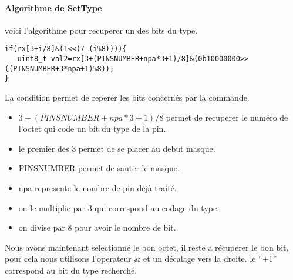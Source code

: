 \paragraph{Algorithme de SetType}
voici l'algorithme pour recuperer un des bits du type.

\begin{verbatim}
if(rx[3+i/8]&(1<<(7-(i%8)))){
   uint8_t val2=rx[3+(PINSNUMBER+npa*3+1)/8]&(0b10000000>>((PINSNUMBER+3*npa+1)%8));
}
\end{verbatim}

La condition permet de reperer les bits concernés par la commande.

\begin{itemize}
\item $3 + (PINSNUMBER + npa*3+1)/8$ permet de recuperer le numéro de l'octet qui code 
un bit du type de la pin.
\item le premier des 3 permet de se placer au debut masque.
\item PINSNUMBER permet de sauter le masque.
\item npa represente le nombre de pin déjà traité.
\item on le multiplie par 3 qui correspond au codage du type.
\item on divise par 8 pour avoir le nombre de bit.
\end{itemize}

Nous avons maintenant selectionné le bon octet, il reste a récuperer le bon bit, pour cela nous utilisons l'operateur \& et un décalage vers la droite.
le ``+1'' correspond au bit du type recherché.



